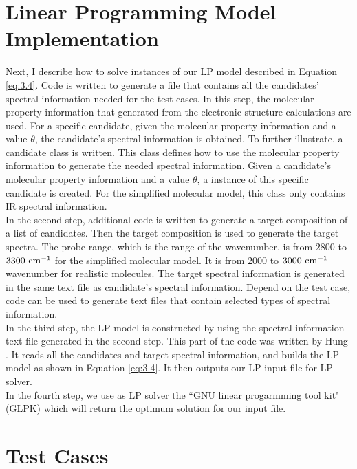 \section{Linear Programming Model Implementation}

Next, I describe how to solve instances of our LP model described in Equation \ref{eq:3.4}. Code is written to generate a file that contains all the candidates' spectral information needed for the test cases. In this step, the molecular property information that generated from the electronic structure calculations are used. For a specific candidate, given the molecular property information and a value $\theta$, the candidate's spectral information is obtained. To further illustrate, a candidate class is written. This class defines how to use the molecular property information to generate the needed spectral information. Given a candidate's molecular property information and a value $\theta$, a instance of this specific candidate is created. For the simplified molecular model, this class only contains IR spectral information. \\

In the second step, additional code is written to generate a target composition of a list of candidates. Then the target composition is used to generate the target spectra. The probe range, which is the range of the wavenumber, is from $2800$  to $3300~\rm cm^{-1}$ for the                    simplified molecular model. It is from $2000$ to $3000~\rm cm^{-1}$ wavenumber for realistic molecules. The target spectral information is generated in the same text file as candidate's spectral information. Depend on the test case, code can be used to generate text files that contain selected types of spectral information. \\

In the third step, the LP model is constructed by using the spectral information text file generated in the second step. This part of the code was written by Hung \cite{KuoKaiHung:Thesis:2015}. It reads all the candidates and target spectral information, and builds the LP model as shown in Equation \ref{eq:3.4}. It then outputs our LP input file for LP solver. \\

In the fourth step, we use as LP solver the ``GNU linear progarmming tool kit" (GLPK) which will return the optimum solution for our input file. \\

\section{Test Cases}

